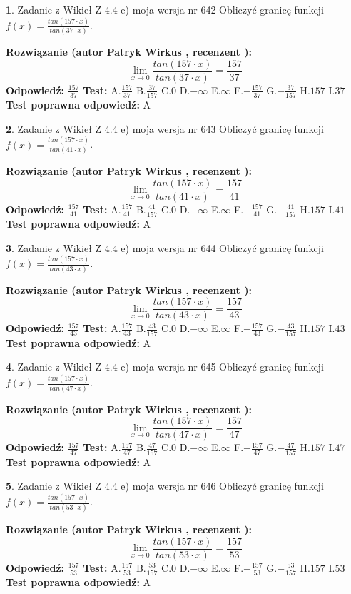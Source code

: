 \documentclass[12pt, a4paper]{article}
\theoremstyle{definition} %
\newtheorem{zad}{}
\newcommand{\zadStart}[1]{\begin{zad}#1\newline}
\newcommand{\zadStop}{\end{zad}}
\newcommand{\rozwStart}[2]{\noindent \textbf{Rozwiązanie (autor #1 , recenzent #2): }\newline}
\newcommand{\rozwStop}{\newline}
\newcommand{\odpStart}{\noindent \textbf{Odpowiedź:}\newline}
\newcommand{\odpStop}{\newline}
\newcommand{\testStart}{\noindent \textbf{Test:}\newline}
\newcommand{\testStop}{\newline}
\newcommand{\kluczStart}{\noindent \textbf{Test poprawna odpowiedź:}\newline}
\newcommand{\kluczStop}{\newline}
\begin{document}
\zadStart{Zadanie z Wikieł Z 4.4 e) moja wersja nr 642}
Obliczyć granicę funkcji $f(x)=\frac{tan(157\cdot x)}{tan(37\cdot x)}$.
\zadStop
\rozwStart{Patryk Wirkus}{}
$$\lim\limits_{x\to 0}\frac{tan(157\cdot x)}{tan(37\cdot x)}=
\frac{157}{37}$$
\rozwStop
\odpStart
$\frac{157}{37}$
\odpStop
\testStart
A.$\frac{157}{37}$
B.$\frac{37}{157}$
C.$0$
D.$-\infty$
E.$\infty$
F.$-\frac{157}{37}$
G.$-\frac{37}{157}$
H.$157$
I.$37$
\testStop
\kluczStart
A
\kluczStop



\zadStart{Zadanie z Wikieł Z 4.4 e) moja wersja nr 643}
Obliczyć granicę funkcji $f(x)=\frac{tan(157\cdot x)}{tan(41\cdot x)}$.
\zadStop
\rozwStart{Patryk Wirkus}{}
$$\lim\limits_{x\to 0}\frac{tan(157\cdot x)}{tan(41\cdot x)}=
\frac{157}{41}$$
\rozwStop
\odpStart
$\frac{157}{41}$
\odpStop
\testStart
A.$\frac{157}{41}$
B.$\frac{41}{157}$
C.$0$
D.$-\infty$
E.$\infty$
F.$-\frac{157}{41}$
G.$-\frac{41}{157}$
H.$157$
I.$41$
\testStop
\kluczStart
A
\kluczStop



\zadStart{Zadanie z Wikieł Z 4.4 e) moja wersja nr 644}
Obliczyć granicę funkcji $f(x)=\frac{tan(157\cdot x)}{tan(43\cdot x)}$.
\zadStop
\rozwStart{Patryk Wirkus}{}
$$\lim\limits_{x\to 0}\frac{tan(157\cdot x)}{tan(43\cdot x)}=
\frac{157}{43}$$
\rozwStop
\odpStart
$\frac{157}{43}$
\odpStop
\testStart
A.$\frac{157}{43}$
B.$\frac{43}{157}$
C.$0$
D.$-\infty$
E.$\infty$
F.$-\frac{157}{43}$
G.$-\frac{43}{157}$
H.$157$
I.$43$
\testStop
\kluczStart
A
\kluczStop



\zadStart{Zadanie z Wikieł Z 4.4 e) moja wersja nr 645}
Obliczyć granicę funkcji $f(x)=\frac{tan(157\cdot x)}{tan(47\cdot x)}$.
\zadStop
\rozwStart{Patryk Wirkus}{}
$$\lim\limits_{x\to 0}\frac{tan(157\cdot x)}{tan(47\cdot x)}=
\frac{157}{47}$$
\rozwStop
\odpStart
$\frac{157}{47}$
\odpStop
\testStart
A.$\frac{157}{47}$
B.$\frac{47}{157}$
C.$0$
D.$-\infty$
E.$\infty$
F.$-\frac{157}{47}$
G.$-\frac{47}{157}$
H.$157$
I.$47$
\testStop
\kluczStart
A
\kluczStop



\zadStart{Zadanie z Wikieł Z 4.4 e) moja wersja nr 646}
Obliczyć granicę funkcji $f(x)=\frac{tan(157\cdot x)}{tan(53\cdot x)}$.
\zadStop
\rozwStart{Patryk Wirkus}{}
$$\lim\limits_{x\to 0}\frac{tan(157\cdot x)}{tan(53\cdot x)}=
\frac{157}{53}$$
\rozwStop
\odpStart
$\frac{157}{53}$
\odpStop
\testStart
A.$\frac{157}{53}$
B.$\frac{53}{157}$
C.$0$
D.$-\infty$
E.$\infty$
F.$-\frac{157}{53}$
G.$-\frac{53}{157}$
H.$157$
I.$53$
\testStop
\kluczStart
A
\kluczStop
\end{document}
